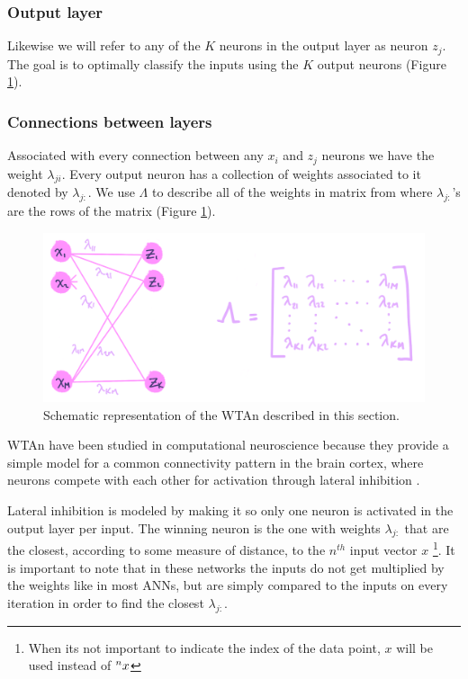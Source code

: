 \documentclass{article}
\begin{document}
\subsubsection*{Output layer}
Likewise we will refer to any of the \(K\) neurons in the output layer as neuron \(z_j\). The goal is to optimally classify the inputs using the \(K\) output neurons (Figure \ref{WTA}).
 
\subsubsection*{Connections between layers}
Associated with every connection between any \(x_i\) and \(z_j\) neurons we have the weight \(\lambda_{ji}\). Every output neuron has a collection of weights associated to it denoted by \(\lambda_{j:}\). We use \(\Lambda\) to describe all of the weights in matrix from where \(\lambda_{j:}\)'s are the rows of the matrix (Figure \ref{WTA}).
 
\begin{figure}[h]
   \includegraphics[width=\textwidth]{img/Untitled_Artwork.png}
   \caption{Schematic representation of the WTAn described in this section. \label{WTA}}
\end{figure}
 
WTAn have been studied in computational neuroscience because they provide a simple
model for a common connectivity pattern in the brain cortex, where
neurons compete with each other for activation through lateral
inhibition \cite{Keck2012}.
 
Lateral inhibition is modeled by making it so only one neuron is activated in the output layer per input. The winning neuron is the one with weights \(\lambda_{j:}\) that are the closest,
according to some measure of distance, to the \(n^{th}\) input vector
\(x\) \footnote{When its not important to indicate the index of the data point,
\(x\) will be used instead of \(\prescript{n}{}{x}\)}. It is important to note that in these networks the inputs do not get multiplied by the weights like in most ANNs, but are simply compared to the inputs on every iteration in order to find the closest \(\lambda_{j:}\).
 
\end{document}
